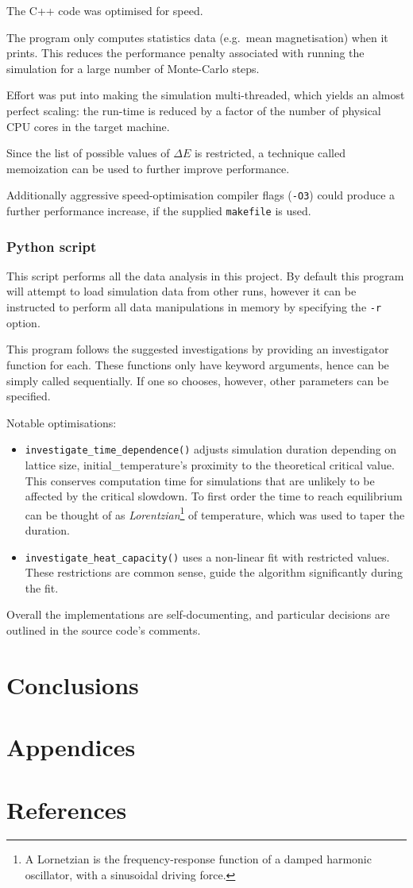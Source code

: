 \documentclass[11pt]{article}
\begin{document}
The C++ code was optimised for speed.

The program only computes statistics data (e.g.~mean magnetisation) when it prints. This reduces the performance penalty associated with running the simulation for a large number of Monte-Carlo steps.

Effort was put into making the simulation multi-threaded, which yields an almost perfect scaling: the run-time is reduced by a factor of the number of physical CPU cores in the target machine.

Since the list of possible values of \(\Delta E\) is restricted, a technique called memoization can be used to further improve performance. 

Additionally aggressive speed-optimisation compiler flags (\texttt{-O3}) could produce a further performance increase, if the supplied \texttt{makefile} is used. 

\subsubsection{Python script}

This script performs all the data analysis in this project. By default this program will attempt to load simulation data from other runs, however it can be instructed to perform all data manipulations in memory by specifying the \texttt{-r} option.

This program follows the suggested investigations by providing an investigator function for each. These functions only have keyword arguments, hence can be simply called sequentially. If one so chooses, however, other parameters can be specified.

Notable optimisations:
\begin{itemize}
\item \texttt{investigate_time_dependence()} adjusts simulation duration depending on lattice size, initial_temperature's proximity to the theoretical critical value. This conserves computation time for simulations that are unlikely to be affected by the critical slowdown. To first order the time to reach equilibrium can be thought of as \emph{Lorentzian}\footnote{A Lornetzian is the frequency-response function of a damped harmonic oscillator, with a sinusoidal driving force. } of temperature, which was used to taper the duration.
\item \texttt{investigate_heat_capacity()} uses a non-linear fit with restricted values. These restrictions are common sense, guide the algorithm significantly during the fit.
  
\end{itemize}

Overall the implementations are self-documenting, and particular decisions are outlined in the source code's comments. 

\section{Conclusions}\label{sec:conclusions}

\section{Appendices}\label{sec:appendices}


\section{References}\label{sec:references}

\tableofcontents
\end{document}

